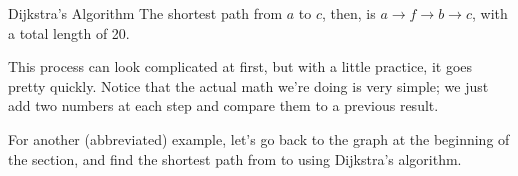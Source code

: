 \begin{example}{Dijkstra's Algorithm}
The shortest path from $a$ to $c$, then, is $\boxed{a \to f \to b \to c}$, with a total length of 20.
\end{example}

This process can look complicated at first, but with a little practice, it goes pretty quickly.  Notice that the actual math we're doing is very simple; we just add two numbers at each step and compare them to a previous result.

For another (abbreviated) example, let's go back to the graph at the beginning of the section, and find the shortest path from  to  using Dijkstra's algorithm.
\begin{center}
\end{center}

